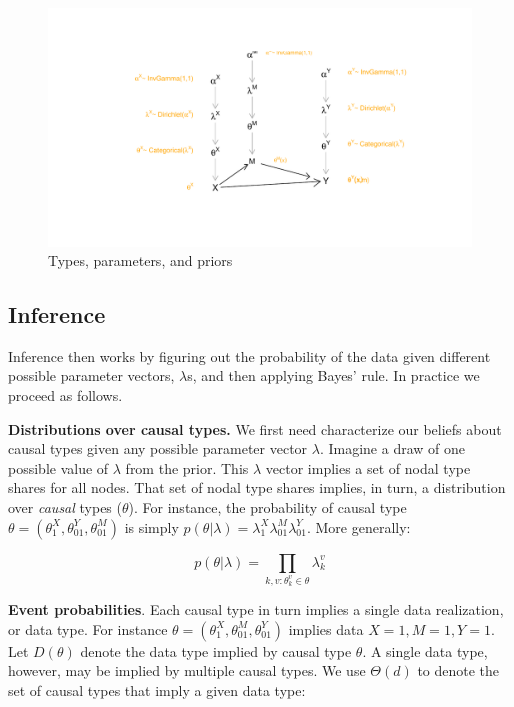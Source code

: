 \documentclass[
  12pt,
]{book}
\begin{document}
\begin{figure}
\includegraphics[width=0.95\linewidth]{ii_files/figure-latex/unnamed-chunk-10-1} \caption{Types, parameters, and priors}\label{fig:unnamed-chunk-10}
\end{figure}

\hypertarget{inference}{%
\subsection{Inference}\label{inference}}

Inference then works by figuring out the probability of the data given different possible parameter vectors, \(\lambda\)s, and then applying Bayes' rule. In practice we proceed as follows.

\textbf{Distributions over causal types.} We first need characterize our beliefs about causal types given any possible parameter vector \(\lambda\). Imagine a draw of one possible value of \(\lambda\) from the prior. This \(\lambda\) vector implies a set of nodal type shares for all nodes. That set of nodal type shares implies, in turn, a distribution over \emph{causal} types (\(\theta\)). For instance, the probability of causal type \(\theta = (\theta^X_1, \theta^Y_{01}, \theta^M_{01})\) is simply \(p(\theta|\lambda)=\lambda^X_1\lambda^M_{01}\lambda^Y_{01}\). More generally:

\[p(\theta|\lambda) = \prod_{k,v:\theta^v_k\in\theta}\lambda^v_k\]

\textbf{Event probabilities}. Each causal type in turn implies a single data realization, or data type. For instance \(\theta = (\theta^X_1, \theta^M_{01}, \theta^Y_{01})\) implies data \(X=1, M=1, Y=1\). Let \(D(\theta)\) denote the data type implied by causal type \(\theta\). A single data type, however, may be implied by multiple causal types. We use \(\Theta(d)\) to denote the set of causal types that imply a given data type:
\end{document}
